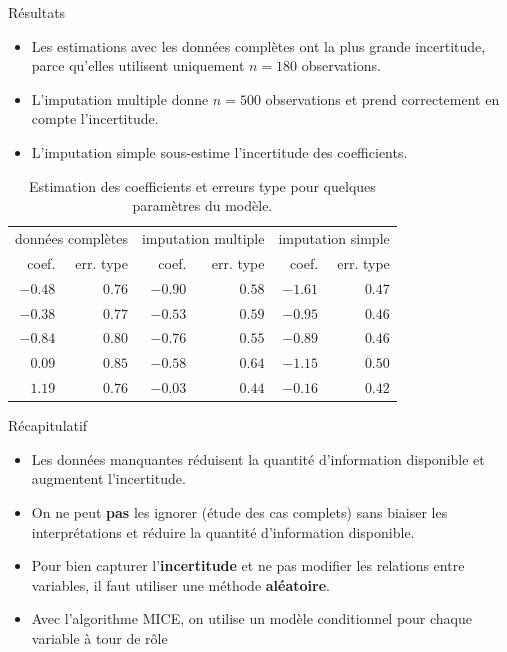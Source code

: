 \documentclass[
  ignorenonframetext,
]{beamer}
\providecommand{\tightlist}{%
  \setlength{\itemsep}{0pt}\setlength{\parskip}{0pt}}\usepackage{longtable,booktabs,array}
\begin{document}
\begin{frame}{Résultats}
\protect\hypertarget{ruxe9sultats}{}
\begin{itemize}
\tightlist
\item
  Les estimations avec les données complètes ont la plus grande
  incertitude, parce qu'elles utilisent uniquement \(n=180\)
  observations.
\item
  L'imputation multiple donne \(n=500\) observations et prend
  correctement en compte l'incertitude.
\item
  L'imputation simple sous-estime l'incertitude des coefficients.
\end{itemize}

\hypertarget{tbl-manquantsres}{}
\begin{longtable}{rrrrrr}
\caption{\label{tbl-manquantsres}Estimation des coefficients et erreurs type pour quelques paramètres du
modèle. }\tabularnewline

\toprule
\multicolumn{2}{c}{données complètes} & \multicolumn{2}{c}{imputation multiple} & \multicolumn{2}{c}{imputation simple} \\ 
\cmidrule(lr){1-2} \cmidrule(lr){3-4} \cmidrule(lr){5-6}
coef. & err. type & coef. & err. type & coef. & err. type \\ 
\midrule\addlinespace[2.5pt]
$-0.48$ & $0.76$ & $-0.90$ & $0.58$ & $-1.61$ & $0.47$ \\ 
$-0.38$ & $0.77$ & $-0.53$ & $0.59$ & $-0.95$ & $0.46$ \\ 
$-0.84$ & $0.80$ & $-0.76$ & $0.55$ & $-0.89$ & $0.46$ \\ 
$0.09$ & $0.85$ & $-0.58$ & $0.64$ & $-1.15$ & $0.50$ \\ 
$1.19$ & $0.76$ & $-0.03$ & $0.44$ & $-0.16$ & $0.42$ \\ 
\bottomrule
\end{longtable}
\end{frame}

\begin{frame}{Récapitulatif}
\protect\hypertarget{ruxe9capitulatif}{}
\begin{itemize}
\tightlist
\item
  Les données manquantes réduisent la quantité d'information disponible
  et augmentent l'incertitude.
\item
  On ne peut \textbf{pas} les ignorer (étude des cas complets) sans
  biaiser les interprétations et réduire la quantité d'information
  disponible.
\item
  Pour bien capturer l'\textbf{incertitude} et ne pas modifier les
  relations entre variables, il faut utiliser une méthode
  \textbf{aléatoire}.
\item
  Avec l'algorithme MICE, on utilise un modèle conditionnel pour chaque
  variable à tour de rôle
\end{itemize}
\end{frame}
\end{document}
